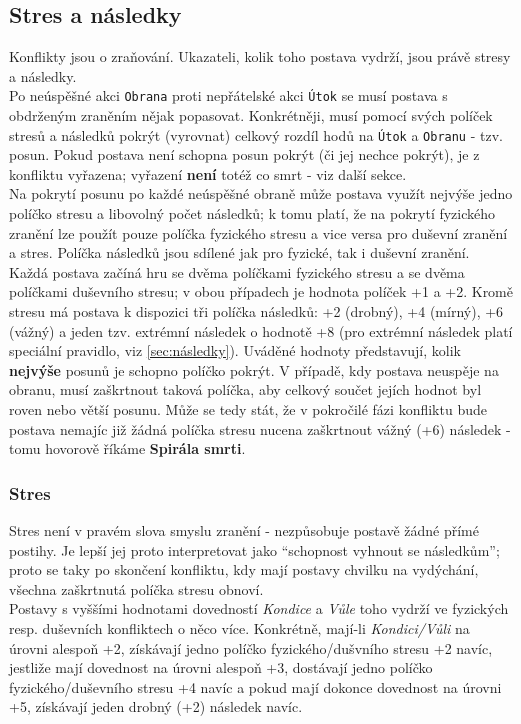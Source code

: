 \subsection{Stres a následky}
\label{sec:stres-nasledky}

Konflikty jsou o zraňování. Ukazateli, kolik toho postava vydrží, jsou právě stresy a následky.\\
Po neúspěšné akci \texttt{Obrana} proti nepřátelské akci \texttt{Útok} se musí postava s obdrženým zraněním nějak popasovat. Konkrétněji, musí pomocí svých políček stresů a následků pokrýt (vyrovnat) celkový rozdíl hodů na \texttt{Útok} a \texttt{Obranu} - tzv. posun. Pokud postava není schopna posun pokrýt (či jej nechce pokrýt), je z konfliktu vyřazena; vyřazení \textbf{není} totéž co smrt - viz další sekce.\\
Na pokrytí posunu po každé neúspěšné obraně může postava využít nejvýše jedno políčko stresu a libovolný počet následků; k tomu platí, že na pokrytí fyzického zranění lze použít pouze políčka fyzického stresu a vice versa pro duševní zranění a stres. Políčka následků jsou sdílené jak pro fyzické, tak i duševní zranění.\\
Každá postava začíná hru se dvěma políčkami fyzického stresu a se dvěma políčkami duševního stresu; v obou případech je hodnota políček +1 a +2. Kromě stresu má postava k dispozici tři políčka následků: +2 (drobný), +4 (mírný), +6 (vážný) a jeden tzv. extrémní následek o hodnotě +8 (pro extrémní následek platí speciální pravidlo, viz \ref{sec:následky}). Uváděné hodnoty představují, kolik \textbf{nejvýše} posunů je schopno políčko pokrýt. V případě, kdy postava neuspěje na obranu, musí zaškrtnout taková políčka, aby celkový součet jejích hodnot byl roven nebo větší posunu. Může se tedy stát, že v pokročilé fázi konfliktu bude postava nemajíc již žádná políčka stresu nucena zaškrtnout vážný (+6) následek - tomu hovorově říkáme \textbf{Spirála smrti}.\\

\subsubsection{Stres}
\label{sec:stres}

Stres není v pravém slova smyslu zranění - nezpůsobuje postavě žádné přímé postihy. Je lepší jej proto interpretovat jako ``schopnost vyhnout se následkům''; proto se taky po skončení konfliktu, kdy mají postavy chvilku na vydýchání, všechna zaškrtnutá políčka stresu obnoví.\\
Postavy s vyššími hodnotami dovedností \textit{Kondice} a \textit{Vůle} toho vydrží ve fyzických resp. duševních konfliktech o něco více. Konkrétně, mají-li \textit{Kondici/Vůli} na úrovni alespoň +2, získávají jedno políčko fyzického/dušvního stresu +2 navíc, jestliže mají dovednost na úrovni alespoň +3, dostávají jedno políčko fyzického/duševního stresu +4 navíc a pokud mají dokonce dovednost na úrovni +5, získávají jeden drobný (+2) následek navíc.

